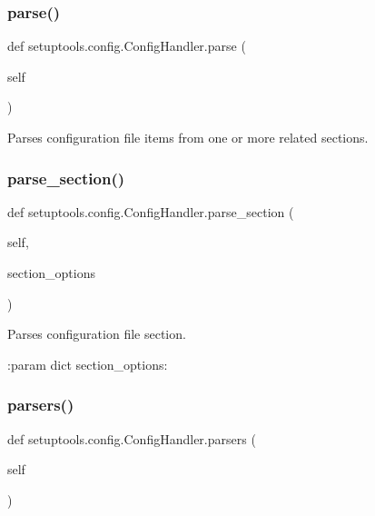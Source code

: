 \subsubsection{\texorpdfstring{parse()}{parse()}}
{\footnotesize\ttfamily def setuptools.\+config.\+Config\+Handler.\+parse (\begin{DoxyParamCaption}\item[{}]{self }\end{DoxyParamCaption})}

\begin{DoxyVerb}Parses configuration file items from one
or more related sections.\end{DoxyVerb}
 \mbox{\label{classsetuptools_1_1config_1_1ConfigHandler_a253ac8a3585f40218d2e09d3243ade5b}} 
\subsubsection{\texorpdfstring{parse\+\_\+section()}{parse\_section()}}
{\footnotesize\ttfamily def setuptools.\+config.\+Config\+Handler.\+parse\+\_\+section (\begin{DoxyParamCaption}\item[{}]{self,  }\item[{}]{section\+\_\+options }\end{DoxyParamCaption})}

\begin{DoxyVerb}Parses configuration file section.

:param dict section_options:
\end{DoxyVerb}
 \mbox{\label{classsetuptools_1_1config_1_1ConfigHandler_aae6195fe85e3caf2da8bf0b41644e234}} 
\subsubsection{\texorpdfstring{parsers()}{parsers()}}
{\footnotesize\ttfamily def setuptools.\+config.\+Config\+Handler.\+parsers (\begin{DoxyParamCaption}\item[{}]{self }\end{DoxyParamCaption})}

